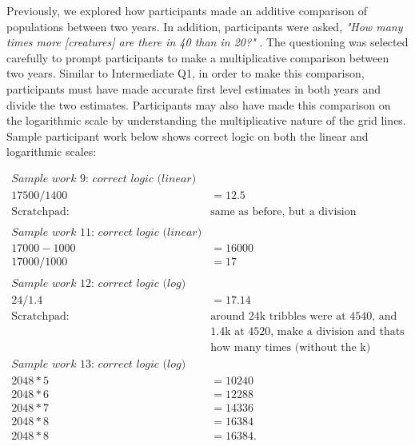 \documentclass[print]{nuthesis}
\begin{document}
Previously, we explored how participants made an additive comparison of populations between two years.
In addition, participants were asked, \textit{"How many times more [creatures] are there in 40 than in 20?"} .
The questioning was selected carefully to prompt participants to make a multiplicative comparison between two years.
Similar to Intermediate Q1, in order to make this comparison, participants must have made accurate first level estimates in both years and divide the two estimates.
Participants may also have made this comparison on the logarithmic scale by understanding the multiplicative nature of the grid lines. Sample participant work below shows correct logic on both the linear and logarithmic scales:

\begin{align}
\textit{Sample work 9: correct logic (linear)} \nonumber\\
17500/1400&=12.5 \nonumber\\    
\text{Scratchpad: } & \text{same as before, but a division} \nonumber\\
\nonumber \\
\textit{Sample work 11: correct logic (linear)} \nonumber\\
17000-1000&=16000 \nonumber\\
17000/1000&=17  \nonumber\\
\nonumber \\
\textit{Sample work 12: correct logic (log)} \nonumber\\
24/1.4&=17.14    \nonumber\\ 
\text{Scratchpad: } & \text{around 24k tribbles were at 4540, and} \nonumber\\
                   & \text{1.4k at 4520, make a division and thats}\nonumber\\
                   & \text{how many times (without the k)}\nonumber
\nonumber \\
\textit{Sample work 13: correct logic (log)} \nonumber\\                   
2048*5&=10240 \nonumber\\   
2048*6&=12288 \nonumber\\   
2048*7&=14336 \nonumber\\   
2048*8&=16384  \nonumber\\   
2048*8&=16384. \nonumber
\end{align}
\end{document}
